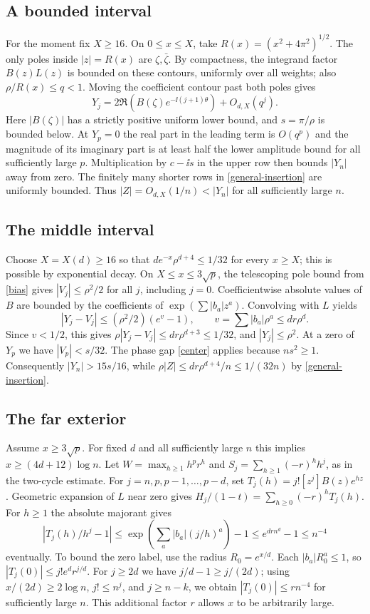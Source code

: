 \subsection{A bounded interval}
For the moment fix \(X\ge16\). On \(0\le x\le X\), take \(R(x)=(x^2+4\pi^2)^{1/2}\). The only poles inside \(|z|=R(x)\) are \(\zeta,\bar\zeta\). By compactness, the integrand factor \(B(z)L(z)\) is bounded on these contours, uniformly over all weights; also \(\rho/R(x)\le q<1\). Moving the coefficient contour past both poles gives
\[
 Y_j=2\Re\!\left(B(\zeta)e^{-\ii(j+1)\theta}\right)+O_{d,X}(q^j).
\]
Here \(|B(\zeta)|\) has a strictly positive uniform lower bound, and \(s=\pi/\rho\) is bounded below. At \(Y_p=0\) the real part in the leading term is \(O(q^p)\) and the magnitude of its imaginary part is at least half the lower amplitude bound for all sufficiently large \(p\). Multiplication by \(c-\ii s\) in the upper row then bounds \(|Y_n|\) away from zero. The finitely many shorter rows in \eqref{general-insertion} are uniformly bounded. Thus \(|Z|=O_{d,X}(1/n)<|Y_n|\) for all sufficiently large \(n\).

\subsection{The middle interval}
Choose \(X=X(d)\ge16\) so that \(d e^{-x}\rho^{d+4}\le1/32\) for every \(x\ge X\); this is possible by exponential decay. On \(X\le x\le3\sqrt p\), the telescoping pole bound from \eqref{bias} gives \(|V_j|\le\rho^2/2\) for all \(j\), including \(j=0\). Coefficientwise absolute values of \(B\) are bounded by the coefficients of \(\exp(\sum |b_a|z^a)\). Convolving with \(L\) yields
\[
 |Y_j-V_j|\le(\rho^2/2)(e^v-1),\qquad
 v=\sum |b_a|\rho^a\le dr\rho^d.
\]
Since \(v<1/2\), this gives \(\rho |Y_j-V_j|\le dr\rho^{d+3}\le1/32\), and \(|Y_j|\le\rho^2\). At a zero of \(Y_p\) we have \(|V_p|<s/32\). The phase gap \eqref{center} applies because \(ns^2\ge1\). Consequently \(|Y_n|>15s/16\), while \(\rho|Z|\le dr\rho^{d+4}/n\le1/(32n)\) by \eqref{general-insertion}.

\subsection{The far exterior}
Assume \(x\ge3\sqrt p\). For fixed \(d\) and all sufficiently large \(n\) this implies \(x\ge(4d+12)\log n\). Let \(W=\max_{h\ge1}h^p r^h\) and \(S_j=\sum_{h\ge1}(-r)^hh^j\), as in the two-cycle estimate. For \(j=n,p,p-1,\ldots,p-d\), set \(T_j(h)=j![z^j]B(z)e^{hz}\). Geometric expansion of \(L\) near zero gives \(H_j/(1-t)=\sum_{h\ge0}(-r)^h T_j(h)\). For \(h\ge1\) the absolute majorant gives
\[
 |T_j(h)/h^j-1|\le \exp\!\left(\sum_a |b_a|(j/h)^a\right)-1
                 \le e^{dr n^d}-1\le n^{-4}
\]
eventually. To bound the zero label, use the radius \(R_0=e^{x/d}\). Each \(|b_a|R_0^a\le1\), so \(|T_j(0)|\le j!e^d r^{j/d}\). For \(j\ge2d\) we have \(j/d-1\ge j/(2d)\); using \(x/(2d)\ge2\log n\), \(j!\le n^j\), and \(j\ge n-k\), we obtain \(|T_j(0)|\le rn^{-4}\) for sufficiently large \(n\). This additional factor \(r\) allows \(x\) to be arbitrarily large.


